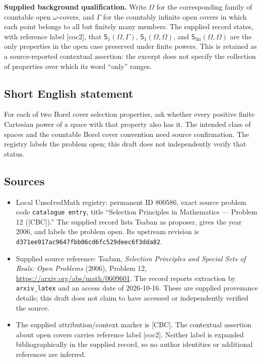 \documentclass[11pt]{article}
\begin{document}
\textbf{Supplied background qualification.} Write \(\Omega\) for the corresponding family of countable open \(\omega\)-covers, and \(\Gamma\) for the countably infinite open covers in which each point belongs to all but finitely many members. The supplied record states, with reference label \textup{[coc2]}, that \(\mathsf S_1(\Omega,\Gamma)\), \(\mathsf S_1(\Omega,\Omega)\), and \(\mathsf S_{\mathrm{fin}}(\Omega,\Omega)\) are the only properties in the open case preserved under finite powers. This is retained as a source-reported contextual assertion: the excerpt does not specify the collection of properties over which its word ``only'' ranges.
\subsection{Short English statement}
For each of two Borel cover selection properties, ask whether every positive finite Cartesian power of a space with that property also has it. The intended class of spaces and the countable Borel cover convention need source confirmation. The registry labels the problem open; this draft does not independently verify that status.
\subsection{Sources}
\begin{itemize}
\item Local UnsolvedMath registry: permanent ID \(800586\), exact source problem code \texttt{catalogue entry}, title ``Selection Principles in Mathematics --- Problem 12 ([CBC]).'' The supplied record lists Tsaban as proposer, gives the year 2006, and labels the problem open. Its upstream revision is \texttt{d371ee917ac9647fbb06cd6fc529deec6f3dda82}.
\item Supplied source reference: Tsaban, \emph{Selection Principles and Special Sets of Reals: Open Problems} (2006), Problem 12, \url{https://arxiv.org/abs/math/0609601}. The record reports extraction by \texttt{arxiv\_latex} and an access date of 2026-10-16. These are supplied provenance details; this draft does not claim to have accessed or independently verified the source.
\item The supplied attribution/context marker is \textup{[CBC]}. The contextual assertion about open covers carries reference label \textup{[coc2]}. Neither label is expanded bibliographically in the supplied record, so no author identities or additional references are inferred.
\end{itemize}
\end{document}
